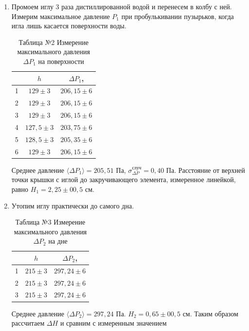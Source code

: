 \documentclass[a4paper]{article}
\begin{document}
\begin{enumerate}
\item Промоем иглу 3 раза дистиллированной водой и перенесем в колбу с ней. Измерим максимальное давление $P_1$ при пробулькивании пузырьков, когда игла лишь касается поверхности воды.

\begin{table}[h!] 
	\caption{Таблица №2 Измерение максимального давления $\Delta P_{1}$ на поверхности}
	\begin{center}
		\begin{tabular}{|*{3}{c|}}
			\hline
			\textnumero  & $h$ & $\Delta P_1$, \text{Па} \\ \hline
			1&	$129 \pm 3$&	$206,15 \pm 6$\\ \hline
			2&	$129 \pm 3$&	$206,15 \pm 6$\\ \hline
			3&	$129 \pm 3$&	$206,15 \pm 6$\\ \hline
			4&	$127,5\pm 3$&	$203,75 \pm 6$\\ \hline
			5&	$128,5\pm 3$&	$205,35 \pm 6$\\ \hline
			6&	$129 \pm 3$&	$206,15 \pm 6$\\ \hline
		\end{tabular}
	\end{center}
\end{table}
Среднее давление $\langle \Delta P_1\rangle = 205,51 $ Па, $\sigma_{\Delta P}^{\text{случ}} = 0,40$ Па. 
Расстояние от верхней точки крышки с иглой до закручивающего элемента, измеренное линейкой, равно $H_1 = 2,25 \pm 00,5\text{ см}$.

\item Утопим иглу практически до самого дна.
\begin{table}[h!] 
	\caption{Таблица №3 Измерение максимального давления $\Delta P_{2}$ на дне}
	\begin{center}
		\begin{tabular}{|*{3}{c|}}
			\hline
			\textnumero  & $h$ & $\Delta P_2$, \text{Па} \\ \hline
			1&	$215 \pm 3$&	$297,24 \pm 6$\\ \hline
			2&	$215 \pm 3$&	$297,24 \pm 6$\\ \hline
			3&	$215 \pm 3$&	$297,24 \pm 6$\\ \hline
		\end{tabular}
	\end{center}
\end{table}
Среднее давление $\langle \Delta P_2\rangle = 297,24 $ Па. $ H_2 = 0,65 \pm 00,5$ см. \newline Таким образом рассчитаем $\Delta H$ и сравним с измеренным значением\\


\end{enumerate}
\end{document}
